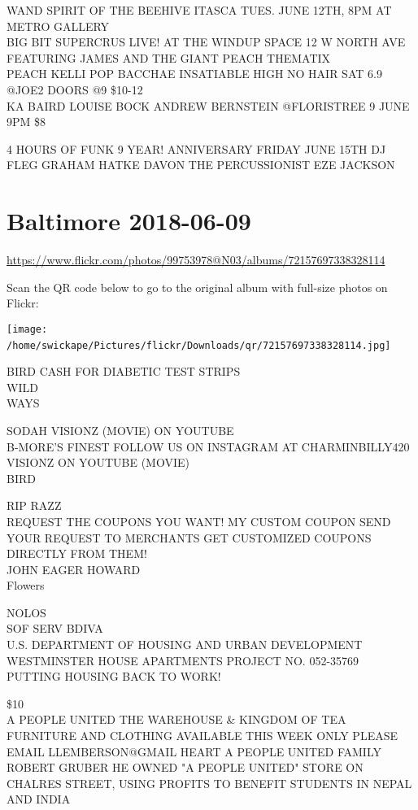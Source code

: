 \documentclass[10pt,letterpaper]{article}
\begin{document}
WAND SPIRIT OF THE BEEHIVE ITASCA TUES. JUNE 12TH, 8PM AT METRO GALLERY\\
BIG BIT SUPERCRUS LIVE! AT THE WINDUP SPACE 12 W NORTH AVE FEATURING JAMES AND THE GIANT PEACH THEMATIX\\
PEACH KELLI POP BACCHAE INSATIABLE HIGH NO HAIR SAT 6.9 @JOE2 DOORS @9 \$10{-}12\\
KA BAIRD LOUISE BOCK ANDREW BERNSTEIN @FLORISTREE 9 JUNE 9PM \$8

4 HOURS OF FUNK 9 YEAR! ANNIVERSARY FRIDAY JUNE 15TH DJ FLEG GRAHAM HATKE DAVON THE PERCUSSIONIST EZE JACKSON
\

\section*{Baltimore 2018-06-09}

\url{https://www.flickr.com/photos/99753978@N03/albums/72157697338328114}

Scan the QR code below to go to the original album with full-size photos on Flickr:

\texttt{[image: /home/swickape/Pictures/flickr/Downloads/qr/72157697338328114.jpg]}
\

BIRD CASH FOR DIABETIC TEST STRIPS\\
WILD\\
WAYS

SODAH VISIONZ (MOVIE) ON YOUTUBE\\
B{-}MORE'S FINEST FOLLOW US ON INSTAGRAM AT CHARMINBILLY420\\
VISIONZ ON YOUTUBE (MOVIE)\\
BIRD

RIP RAZZ\\
REQUEST THE COUPONS YOU WANT!  MY CUSTOM COUPON SEND YOUR REQUEST TO MERCHANTS GET CUSTOMIZED COUPONS DIRECTLY FROM THEM!\\
JOHN EAGER HOWARD\\
Flowers

NOLOS\\
SOF SERV BDIVA\\
U.S. DEPARTMENT OF HOUSING AND URBAN DEVELOPMENT WESTMINSTER HOUSE APARTMENTS PROJECT NO. 052{-}35769\\
PUTTING HOUSING BACK TO WORK!

\$10\\
A PEOPLE UNITED THE WAREHOUSE \& KINGDOM OF TEA\\
FURNITURE AND CLOTHING AVAILABLE THIS WEEK ONLY PLEASE EMAIL LLEMBERSON@GMAIL HEART A PEOPLE UNITED FAMILY\\
ROBERT GRUBER HE OWNED "A PEOPLE UNITED" STORE ON CHALRES STREET, USING PROFITS TO BENEFIT STUDENTS IN NEPAL AND INDIA
\end{document}
